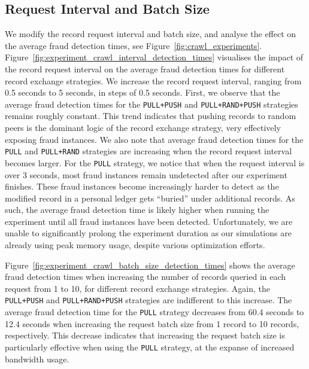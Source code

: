 \subsection{Request Interval and Batch Size}
We modify the record request interval and batch size, and analyse the effect on the average fraud detection times, see Figure~\ref{fig:crawl_experiments}.
Figure~\ref{fig:experiment_crawl_interval_detection_times} visualises the impact of the record request interval on the average fraud detection times for different record exchange strategies.
We increase the record request interval, ranging from 0.5 seconds to 5 seconds, in steps of 0.5 seconds.
First, we observe that the average fraud detection times for the \texttt{PULL+PUSH} and \texttt{PULL+RAND+PUSH} strategies remains roughly constant.
This trend indicates that pushing records to random peers is the dominant logic of the record exchange strategy, very effectively exposing fraud instances.
We also note that average fraud detection times for the \texttt{PULL} and \texttt{PULL+RAND} strategies are increasing when the record request interval becomes larger.
For the \texttt{PULL} strategy, we notice that when the request interval is over 3 seconds, most fraud instances remain undetected after our experiment finishes.
These fraud instances become increasingly harder to detect as the modified record in a personal ledger gets \enquote{buried} under additional records.
As such, the average fraud detection time is likely higher when running the experiment until all fraud instances have been detected.
Unfortunately, we are unable to significantly prolong the experiment duration as our simulations are already using peak memory usage, despite various optimization efforts.

Figure~\ref{fig:experiment_crawl_batch_size_detection_times} shows the average fraud detection times when increasing the number of records queried in each request from 1 to 10, for different record exchange strategies.
Again, the \texttt{PULL+PUSH} and \texttt{PULL+RAND+PUSH} strategies are indifferent to this increase.
The average fraud detection time for the \texttt{PULL} strategy decreases from 60.4 seconds to 12.4 seconds when increasing the request batch size from 1 record to 10 records, respectively.
This decrease indicates that increasing the request batch size is particularly effective when using the \texttt{PULL} strategy, at the expanse of increased bandwidth usage.

